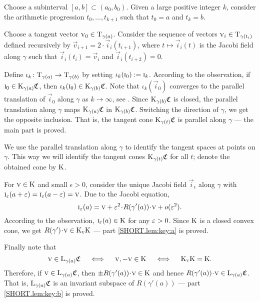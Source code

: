 \documentclass[a4paper,10pt]{article}
\begin{document}
Choose a subinterval $[a,b] \subset (a_0,b_0)$.
Given a large positive integer $k$, consider  {\color{red}  the } arithmetic progression
$t_0,\dots,t_{k+1}$ such that $t_0=a$ and $t_k=b$.

Choose a tangent vector $\text{\sc{v}}_0\in\mathrm{T}_{\gamma(a)}$.
Consider the sequence of vectors $\vec{v}_i\z\in\T_{\gamma(t_i)}$ defined recursively by $\vec{v}_{i+1}=2\cdot \vec{i}_i(t_{i+1})$, where $t\mapsto \vec{i}_i(t)$ is the Jacobi field along $\gamma$ such that $\vec{i}_i(t_i)=\vec{v}_i$ and $\vec{i}_i(t_{i+2})=0$.

Define $\iota_k\colon\mathrm{T}_{\gamma(a)}\to \mathrm{T}_{\gamma(b)}$ by setting $\iota_k(\text{\sc{i}}_0)\mathrel{{:}{=}} \text{\sc{i}}_k$.
According to the observation, if $\text{\sc{i}}_0\in \mathrm{K}_{\gamma(a)}\mathfrak{C}$, then $\iota_k(\text{\sc{i}}_0)\in \mathrm{K}_{\gamma(b)}\mathfrak{C}$.
Note that $\iota_k(\vec{i}_0)$ converges to the parallel translation of $\vec{i}_0$ along $\gamma$ as $k\to \infty${\color{red}, see \cite{Ber-Nik}}.
Since $\mathrm{K}_{\gamma(b)}\mathfrak{C}$ is closed,
the parallel translation along $\gamma$ maps $\mathrm{K}_{\gamma(a)}\mathfrak{C}$ in $\mathrm{K}_{\gamma(b)}\mathfrak{C}$.
Switching the direction of $\gamma$, we get the opposite inclusion.
That is, the tangent cone $\mathrm{K}_{\gamma(t)}\mathfrak{C}$ is parallel along $\gamma$ --- the main part is proved.

{\color{red} We use the parallel translation along $\gamma$ to 
identify the tangent spaces at 
 points} on $\gamma$.
This way we will identify the tangent cones $\mathrm{K}_{\gamma(t)}\mathfrak{C}$ for all $t$;
denote the obtained cone by $\mathrm{K}$.

For $\text{\sc{v}}\in \mathrm{K}$ and small $\epsilon>0$, consider the unique Jacobi field $\vec{i}_\epsilon$ along $\gamma$ with $\vec{i}_\epsilon (a+\eps)\z=\vec{i} _\epsilon(a-\eps)=\vec{v}$.
Due to the Jacobi equation,
\[\vec{i}_\epsilon (a)=\vec{v} +\eps^2\cdot R(\gamma'(a))\cdot \vec{v} +o(\eps^2).\]
According to the observation, $\text{\sc{i}}_\varepsilon(a)\in \mathrm{K}$ for any $\varepsilon>0$.
Since $\mathrm{K}$ is a closed convex cone, we get $R(\gamma')\cdot \vec{v}\z\in \K_\vec{v}\K$ --- part \ref{SHORT.lem:key:a} is proved.

Finally note that 
\[\text{\sc{v}}\in \mathrm{L}_{\gamma(a)}\mathfrak{C}
\quad\iff\quad 
\text{\sc{v}}, -\text{\sc{v}}\in \mathrm{K}
\quad\iff\quad 
\mathrm{K}_{\text{\sc{v}}}\mathrm{K}=\mathrm{K}.
\]
Therefore, if $\text{\sc{v}}\in \mathrm{L}_{\gamma(a)}\mathfrak{C}$, then $\pm R(\gamma'(a))\cdot \vec{v}\in \K$ and hence $R(\gamma'(a))\cdot \vec{v}\in \L_{\gamma(a)}\mathfrak{C}$.
That is, $\mathrm{L}_{\gamma(a)}\mathfrak{C}$ is an invariant subspace of $R(\gamma'(a))$ --- part \ref{SHORT.lem:key:b} is proved.
\qeds
\end{document}
